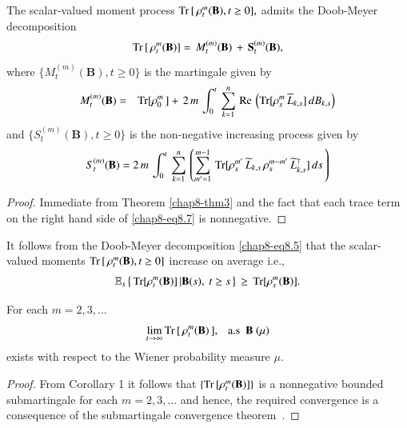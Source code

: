 \setcounter{coro}{0}
\begin{coro}
The scalar-valued moment process ${\rm Tr}\,[\, \rho_t^m(\mathbf{B}), t\geq 0],$ admits the Doob-Meyer decomposition~\cite{chap8-key39, chap8-key40} 
\begin{equation} 
{\rm Tr}\,[\, \rho_t^m(\mathbf{B})]=\, M^{(m)}_t(\mathbf{B}) \, +\, \mathbf{S}^{(m)}_t(\mathbf{B}),\label{chap8-eq8.5}
\end{equation}
where $\{M^{(m)}_t(\mathbf{B}), t\geq 0\}$  is the martingale given by 
\begin{eqnarray} 
M^{(m)}_t(\mathbf{B}) &=& {\rm Tr}[\rho_0^m\,]+\, 2\,m\, \int_{0}^{t}\,  \sum_{k=1}^n\, {\rm Re}\,\left({\rm Tr}[\rho_s^m\, \widetilde{L}_{k,s}]\, dB_{k,s}\right)\label{chap8-eq8.6}
\end{eqnarray}
and $\{S^{(m)}_t(\mathbf{B}), t\geq 0\}$ is the non-negative increasing process given by 
\begin{eqnarray}
S^{(m)}_t(\mathbf{B}) = 2\, m\, \int_{0}^{t}\,  \sum_{k=1}^n\, \left(\sum_{m'=1}^{m-1}\, {\rm Tr}[\rho_s^{m'}\, \widetilde{L}_{k,s}\, \rho_s^{m-m'}\, \widetilde{L}_{k,s}^\dag]\, ds\, \right) \label{chap8-eq8.7}
\end{eqnarray}
\end{coro}
\begin{proof}
Immediate from Theorem \ref{chap8-thm3}  and the fact that each trace term on the right hand side of \eqref{chap8-eq8.7} is nonnegative. 
\end{proof}
\begin{remark}
It follows from the Doob-Meyer decomposition \eqref{chap8-eq8.5}  that the scalar-valued moments ${\rm Tr}\,[\, \rho_t^m(\mathbf{B}), t\geq 0]$  increase on average i.e., 
\begin{eqnarray}
\mathbb{E}_s\left\{\, {\rm Tr}[\rho^m_t(\mathbf{B})]\, \vert \mathbf{B}(s),\ t\geq s\, \right\}\, \geq\, 
{\rm Tr}[\rho^m_s(\mathbf{B})]. \label{chap8-eq8.8}
\end{eqnarray}
\end{remark}

\begin{coro} %
For each $m=2,3,\ldots $ 
$$
\underset{t\rightarrow\infty}{\lim}\, {\rm Tr}\, [\,\rho_t^m(\mathbf{B})\,], \ \ \ {\rm a.s} \ \ \mathbf{B}\ (\mu)
$$ 
exists with respect to the Wiener probability measure $\mu$. 
\end{coro}

\begin{proof}
From Corollary 1 it follows that $\{{\rm Tr}\,[\rho_t^m(\mathbf{B})]\}$ is a nonnegative bounded submartingale for each $m=2,3,\ldots$ and hence, the required convergence  is a consequence of the submartingale convergence theorem~\cite{chap8-key39, chap8-key40}.
\end{proof}

